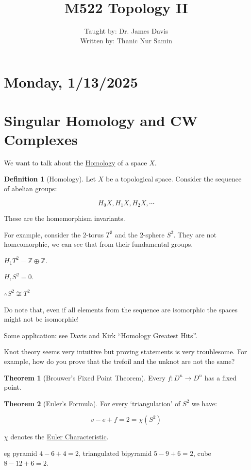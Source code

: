 \documentclass{article}
\title{M522 Topology II}
\author{Taught by: Dr. James Davis \\ Written by: Thanic Nur Samin}
\date{\vspace{-5ex}}
\theoremstyle{definition}
\newtheorem*{definition}{Definition}
\newtheorem{theorem}{Theorem}
\begin{document}
    \maketitle

    \section*{Monday, 1/13/2025}
    
    \section*{Singular Homology and CW Complexes}

    We want to talk about the \underline{Homology} of a space \(X\).

    \begin{definition}
        [Homology] Let \(X\) be a topological space. Consider the sequence of abelian groups:

        \[
            H_0 X, H_1 X, H_2 X, \cdots 
        \]

        These are the homemorphism invariants.

    \end{definition}

    For example, consider the \(2\)-torus \(T^2\) and the \(2\)-sphere \(S^2\). They are not homeomorphic, we can see that from their fundamental groups.


    \(H_1 T^2 = \mathbb{Z} \oplus \mathbb{Z}\).

    \(H_1 S^2 = 0\).

    \(\therefore S^2 \not\cong T^2\) 

    Do note that, even if all elements from the sequence are isomorphic the spaces might not be isomorphic!

    Some application: see Davis and Kirk ``Homology Greatest Hits''.

    Knot theory seems very intuitive but proving statements is very troublesome. For example, how do you prove that the trefoil and the unknot are not the same?

    \begin{theorem}
        [Brouwer's Fixed Point Theorem] Every \(f:D^n \to D^n\) has a fixed point.
    \end{theorem}

    \begin{theorem}
        [Euler's Formula] For every `triangulation' of \(S^2\) we have:

        \[
            v - e + f = 2 = \chi(S^2)
        \]

        \(\chi\) denotes the \underline{Euler Characteristic}.

        eg pyramid \(4-6+4=2\), triangulated bipyramid \(5-9+6 = 2\), cube \(8-12+6=2\).

    \end{theorem}
\end{document}
